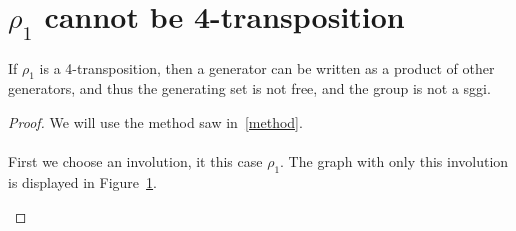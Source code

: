 \section{$\rho_1$ cannot be 4-transposition}

\begin{theorem}
  \label{exclude-1}
  If $\rho_1$ is a 4-transposition, then a generator can be written as a product of other generators, and thus the generating set is not free, and the group is not a sggi.
\end{theorem}

\begin{proof}
We will use the method saw in~\ref{method}.

\paragraph{}
First we choose an involution, it this case $\rho_1$. The graph with only this involution is displayed in Figure~\ref{proof-5-1}.

\begin{figure}[H]
  \begin{center}
    \caption{}
    \label{proof-5-1}
  \end{center}
\end{figure}


\end{proof}
